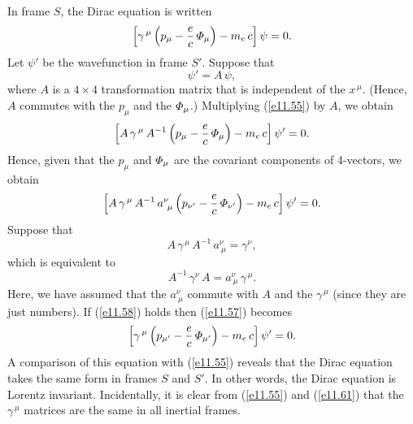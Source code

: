 In  frame $S$, the Dirac equation is written
\begin{equation}\label{e11.55}
\left[\gamma^{\,\mu}\left(p_\mu- \frac{e}{c}\,{\mit\Phi}_\mu\right)-m_e\,c\right]\psi = 0.
\end{equation}
Let $\psi'$ be the wavefunction in frame $S'$. Suppose that
\begin{equation}
\psi' = A\,\psi,
\end{equation}
where $A$ is a $4\times 4$ transformation matrix that is independent of the $x^{\,\mu}$. (Hence, $A$ commutes with the $p_\mu$ and the ${\mit\Phi}_\mu$.)
Multiplying (\ref{e11.55}) by $A$, we obtain
\begin{equation}
\left[A\,\gamma^{\,\mu}\,A^{-1}\left(p_\mu- \frac{e}{c}\,{\mit\Phi}_\mu\right)-m_e\,c\right]\psi' = 0.
\end{equation}
Hence, given that the $p_\mu$ and ${\mit\Phi}_\mu$ are the covariant components of 4-vectors, we obtain
\begin{equation}\label{e11.57}
\left[A\,\gamma^{\,\mu}\,A^{-1}\,a^\nu_{~\mu}\left(p_{\nu'}- \frac{e}{c}\,{\mit\Phi}_{\nu'}\right)-m_e\,c\right]\psi' = 0.
\end{equation}
Suppose that
\begin{equation}\label{e11.58}
A\,\gamma^{\,\mu}\,A^{-1}\,a^\nu_{~\mu} = \gamma^\nu,
\end{equation}
which is equivalent to 
\begin{equation}\label{e11.59}
A^{-1}\,\gamma^\nu\,A = a^\nu_{~\mu}\,\gamma^{\,\mu}.
\end{equation}
Here, we have assumed that the $a^\nu_{~\mu}$ commute with $A$ and the $\gamma^{\,\mu}$ (since they are just numbers). If (\ref{e11.58})
holds then (\ref{e11.57}) becomes
\begin{equation}\label{e11.61}
\left[\gamma^{\,\mu}\left(p_{\mu'}- \frac{e}{c}\,{\mit\Phi}_{\mu'}\right)-m_e\,c\right]\psi' = 0.
\end{equation}
A comparison of this equation with (\ref{e11.55}) reveals that the Dirac equation takes the same form in frames $S$ and $S'$. In other words, the
Dirac equation is Lorentz invariant. Incidentally, it is clear from (\ref{e11.55}) and (\ref{e11.61}) that the $\gamma^{\,\mu}$ matrices are
the same in all inertial frames. 

